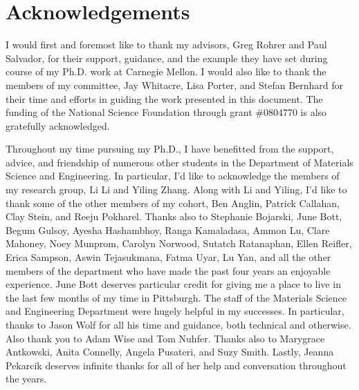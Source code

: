 \documentclass[12pt,%
              twoside,
               letterpaper]{uiothesis}
\author{Andrew M. Schultz}
\begin{document}
%  


  \frontmatter
    
     
	 
    
\chapter{Acknowledgements}


I would first and foremost like to thank my advisors, Greg Rohrer and Paul Salvador, for
their support, guidance, and the example they have set during course of my Ph.D. work at
Carnegie Mellon. I would also like to thank the members of my committee, Jay Whitacre,
Lisa Porter, and Stefan Bernhard for their time and efforts in guiding the work presented
in this document. The funding of the National Science Foundation through grant
\#0804770 is also gratefully acknowledged.

Throughout my time pursuing my Ph.D., I have benefitted from the support, advice, and
friendship of numerous other students in the Department of Materials Science and
Engineering. In particular, I'd like to acknowledge the members of my research group, Li
Li and Yiling Zhang. Along with Li and Yiling, I'd like to thank some of the other members of my
cohort, Ben Anglin, Patrick Callahan, Clay Stein, and Reeju Pokharel. Thanks also to
Stephanie Bojarski, June Bott, Begum Gulsoy, Ayesha Hashambhoy, Ranga Kamaladasa, Ammon
Lu, Clare Mahoney, Noey Munprom, Carolyn Norwood, Sutatch Ratanaphan, Ellen Reifler, Erica
Sampson, Aswin Tejasukmana, Fatma Uyar, Lu Yan, and all the other members of the department who have made the
past four years an enjoyable experience. June Bott deserves particular credit for giving
me a place to live in the last few months of my time in Pittsburgh. The staff of the
Materials Science and Engineering Department were hugely helpful in my successes. In
particular, thanks to Jason Wolf for all his time and guidance, both technical and
otherwise. Also thank you to Adam Wise and Tom Nuhfer. Thanks also to Marygrace Antkowski,
 Anita Connelly, Angela Pusateri, and Suzy Smith. Lastly, Jeanna Pekarcik deserves
infinite thanks for all of her help and conversation throughout the years.
\end{document}
